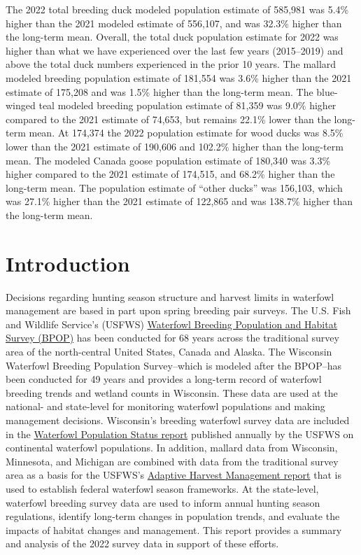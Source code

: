 \documentclass[
  12pt,
]{article}
\begin{document}
The 2022 total breeding duck modeled population estimate of 585,981 was
5.4\% higher than the 2021 modeled estimate of 556,107, and was 32.3\%
higher than the long-term mean. Overall, the total duck population
estimate for 2022 was higher than what we have experienced over the last
few years (2015--2019) and above the total duck numbers experienced in
the prior 10 years. The mallard modeled breeding population estimate of
181,554 was 3.6\% higher than the 2021 estimate of 175,208 and was 1.5\%
higher than the long-term mean. The blue-winged teal modeled breeding
population estimate of 81,359 was 9.0\% higher compared to the 2021
estimate of 74,653, but remains 22.1\% lower than the long-term mean. At
174,374 the 2022 population estimate for wood ducks was 8.5\% lower than
the 2021 estimate of 190,606 and 102.2\% higher than the long-term mean.
The modeled Canada goose population estimate of 180,340 was 3.3\% higher
compared to the 2021 estimate of 174,515, and 68.2\% higher than the
long-term mean. The population estimate of ``other ducks'' was 156,103,
which was 27.1\% higher than the 2021 estimate of 122,865 and was
138.7\% higher than the long-term mean.

\newpage

\hypertarget{introduction}{%
\section{Introduction}\label{introduction}}

Decisions regarding hunting season structure and harvest limits in
waterfowl management are based in part upon spring breeding pair
surveys. The U.S. Fish and Wildlife Service's (USFWS)
\href{https://www.fws.gov/birds/surveys-and-data/population-surveys.php}{Waterfowl
Breeding Population and Habitat Survey (BPOP)} has been conducted for 68
years across the traditional survey area of the north-central United
States, Canada and Alaska. The Wisconsin Waterfowl Breeding Population
Survey--which is modeled after the BPOP--has been conducted for 49 years
and provides a long-term record of waterfowl breeding trends and wetland
counts in Wisconsin. These data are used at the national- and
state-level for monitoring waterfowl populations and making management
decisions. Wisconsin's breeding waterfowl survey data are included in
the
\href{https://www.fws.gov/birds/surveys-and-data/reports-and-publications/population-status.php}{Waterfowl
Population Status report} published annually by the USFWS on continental
waterfowl populations. In addition, mallard data from Wisconsin,
Minnesota, and Michigan are combined with data from the traditional
survey area as a basis for the USFWS's
\href{https://www.fws.gov/birds/management/adaptive-harvest-management/publications-and-reports.php}{Adaptive
Harvest Management report} that is used to establish federal waterfowl
season frameworks. At the state-level, waterfowl breeding survey data
are used to inform annual hunting season regulations, identify long-term
changes in population trends, and evaluate the impacts of habitat
changes and management. This report provides a summary and analysis of
the 2022 survey data in support of these efforts.
\end{document}

